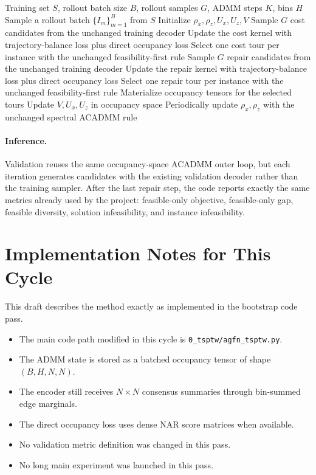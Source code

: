 \documentclass{article}
\begin{document}
\begin{algorithm}[t]
\caption{Cycle training with time-expanded occupancy consensus}
\label{alg:cycle-training}
\begin{algorithmic}[1]
\REQUIRE Training set $S$, rollout batch size $B$, rollout samples $G$, ADMM steps $K$, bins $H$
    \STATE Sample a rollout batch $\{I_m\}_{m=1}^{B}$ from $S$
    \STATE Initialize $\rho_x,\rho_z,U_x,U_z,V$
        \STATE Sample $G$ cost candidates from the unchanged training decoder
        \STATE Update the cost kernel with trajectory-balance loss plus direct occupancy loss
        \STATE Select one cost tour per instance with the unchanged feasibility-first rule
        \STATE Sample $G$ repair candidates from the unchanged training decoder
        \STATE Update the repair kernel with trajectory-balance loss plus direct occupancy loss
        \STATE Select one repair tour per instance with the unchanged feasibility-first rule
        \STATE Materialize occupancy tensors for the selected tours
        \STATE Update $V,U_x,U_z$ in occupancy space
        \STATE Periodically update $\rho_x,\rho_z$ with the unchanged spectral ACADMM rule
    \ENDFOR
\ENDFOR
\end{algorithmic}
\end{algorithm}

\paragraph{Inference.}
Validation reuses the same occupancy-space ACADMM outer loop, but each iteration generates candidates with the existing validation decoder rather than the training sampler. After the last repair step, the code reports exactly the same metrics already used by the project: feasible-only objective, feasible-only gap, feasible diversity, solution infeasibility, and instance infeasibility.

\section{Implementation Notes for This Cycle}
This draft describes the method exactly as implemented in the bootstrap code pass.
\begin{itemize}
\item The main code path modified in this cycle is \texttt{0\_tsptw/agfn\_tsptw.py}.
\item The ADMM state is stored as a batched occupancy tensor of shape $(B,H,N,N)$.
\item The encoder still receives $N\times N$ consensus summaries through bin-summed edge marginals.
\item The direct occupancy loss uses dense NAR score matrices when available.
\item No validation metric definition was changed in this pass.
\item No long main experiment was launched in this pass.
\end{itemize}
\end{document}
